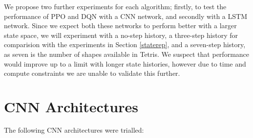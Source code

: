\documentclass[12pt]{article}
\begin{document}
We propose two further experiments for each algorithm; firstly, to test the performance of PPO and DQN with a CNN network, and secondly with a LSTM network. Since we expect both these networks to perform better with a larger state space, we will experiment with a no-step history, a three-step history for comparision with the experiments in Section \ref{staterep}, and a seven-step history, as seven is the number of shapes available in Tetris. We suspect that performance would improve up to a limit with longer state histories, however due to time and compute constraints we are unable to validate this further.
\section{CNN Architectures}\label{cnntrials}
The following CNN architectures were trialled: 
\end{document}
